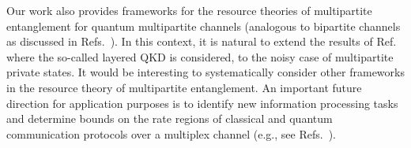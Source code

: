 \documentclass[aps,pra,twocolumn,superscriptaddress,longbibliography]{revtex4-1}
\begin{document}
Our work also provides frameworks for the resource theories of multipartite entanglement for quantum multipartite channels (analogous to bipartite channels as discussed in Refs.~\cite{D18thesis,DBW17,BDWW19,GS19}). In this context, it is natural to extend the results of Ref.~\cite{PHM18} where the so-called layered QKD is considered, to the noisy case of multipartite private states. It would be interesting to systematically consider other frameworks in the resource theory of multipartite entanglement. An important future direction for application purposes is to identify new information processing tasks and determine bounds on the rate regions of classical and quantum communication protocols over a multiplex channel (e.g., see Refs.~\cite{Sha61,GKbook,BHTW10,WDW16,D18thesis,LALS19,TR19,DW19}).



\medskip
\end{document}
